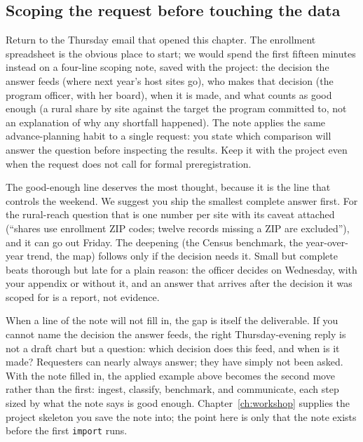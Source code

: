 \documentclass[
    a4paper,
    fontsize=10pt,
    twoside=true,
    numbers=noenddot,
]{kaobook}
\begin{document}
\subsection{Scoping the request before touching the data}\label{sec:ch01-sc-scoping}
Return to the Thursday email that opened this chapter. The enrollment spreadsheet is the obvious place to start; we would spend the first fifteen minutes instead on a four-line scoping note, saved with the project: the decision the answer feeds (where next year's host sites go), who makes that decision (the program officer, with her board), when it is made, and what counts as good enough (a rural share by site against the target the program committed to, not an explanation of why any shortfall happened). The note applies the same advance-planning habit to a single request: you state which comparison will answer the question before inspecting the results. Keep it with the project even when the request does not call for formal preregistration.

The good-enough line deserves the most thought, because it is the line that controls the weekend. We suggest you ship the smallest complete answer first. For the rural-reach question that is one number per site with its caveat attached (\enquote{shares use enrollment ZIP codes; twelve records missing a ZIP are excluded}), and it can go out Friday. The deepening (the Census benchmark, the year-over-year trend, the map) follows only if the decision needs it. Small but complete beats thorough but late for a plain reason: the officer decides on Wednesday, with your appendix or without it, and an answer that arrives after the decision it was scoped for is a report, not evidence.

When a line of the note will not fill in, the gap is itself the deliverable. If you cannot name the decision the answer feeds, the right Thursday-evening reply is not a draft chart but a question: which decision does this feed, and when is it made? Requesters can nearly always answer; they have simply not been asked. With the note filled in, the applied example above becomes the second move rather than the first: ingest, classify, benchmark, and communicate, each step sized by what the note says is good enough. Chapter~\ref{ch:workshop} supplies the project skeleton you save the note into; the point here is only that the note exists before the first \texttt{import} runs.
\end{document}
